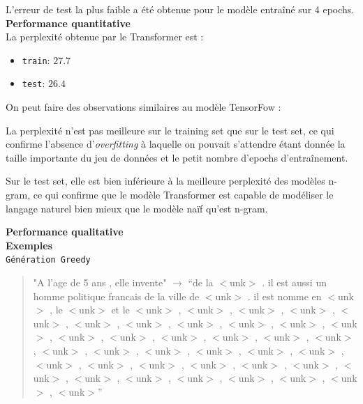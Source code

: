 L’erreur de test la plus faible a été obtenue pour le modèle entraîné sur 4 epochs. \\

\noindent{}\textbf{Performance quantitative} \\

La perplexité obtenue par le Transformer est :

\begin{itemize}
\item
  \texttt{train}: \(27.7\)
\item
  \texttt{test}: \(26.4\)
\end{itemize}

On peut faire des observations similaires au modèle TensorFow :

La perplexité n'est pas meilleure sur le training set que sur
le test set, ce qui confirme l'absence d'\textit{overfitting} à laquelle
on pouvait s'attendre étant donnée la taille importante du jeu de
données et le petit nombre d'epochs d'entraînement.

Sur le test set, elle est bien inférieure à la
meilleure perplexité des modèles n-gram, ce qui confirme que le modèle Transformer est capable de modéliser le langage naturel bien mieux que le modèle naïf qu'est
n-gram. \\

\newpage

\noindent{}\textbf{Performance qualitative} \\

\textbf{Exemples} \\

\noindent{} \texttt{Génération Greedy}

\begin{quotation}
"A l'age de 5 ans , elle invente" $\rightarrow$  “de la $<$unk$>$ . il est aussi un homme politique francais de la ville de $<$unk$>$ . il est nomme en $<$unk$>$ , le $<$unk$>$ et le $<$unk$>$ , $<$unk$>$ , $<$unk$>$ , $<$unk$>$ , $<$unk$>$ , $<$unk$>$ , $<$unk$>$ , $<$unk$>$ , $<$unk$>$ , $<$unk$>$ , $<$unk$>$ , $<$unk$>$ , $<$unk$>$ , $<$unk$>$ , $<$unk$>$ , $<$unk$>$ , $<$unk$>$ , $<$unk$>$ , $<$unk$>$ , $<$unk$>$ , $<$unk$>$ , $<$unk$>$ , $<$unk$>$ , $<$unk$>$ , $<$unk$>$ , $<$unk$>$ , $<$unk$>$ , $<$unk$>$ , $<$unk$>$ , $<$unk$>$ , $<$unk$>$ , $<$unk$>$ , $<$unk$>$ , $<$unk$>$ , $<$unk$>$ , $<$unk$>$ , $<$unk$>$”
\end{quotation}

\vspace{0.4cm}

